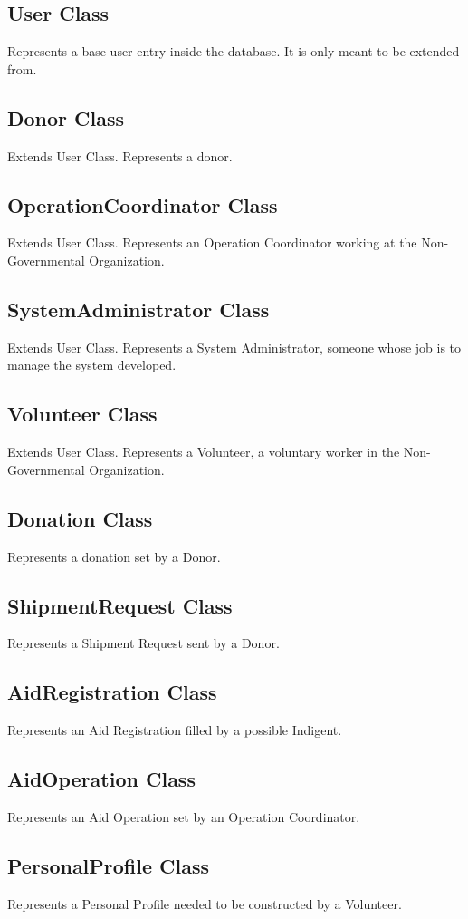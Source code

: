\documentclass[a4paper,12pt]{report}
\begin{document}
		\subsection{User Class}
			Represents a base user entry inside the database. It is only meant to be extended from.
		\subsection{Donor Class}
			Extends User Class. Represents a donor.
		\subsection{OperationCoordinator Class}
			Extends User Class. Represents an Operation Coordinator working at the Non-Governmental Organization.
		\subsection{SystemAdministrator Class}
			Extends User Class. Represents a System Administrator, someone whose job is to manage the system developed.
		\subsection{Volunteer Class}
			Extends User Class. Represents a Volunteer, a voluntary worker in the Non-Governmental Organization.
		\subsection{Donation Class}
			Represents a donation set by a Donor.
		\subsection{ShipmentRequest Class}
			Represents a Shipment Request sent by a Donor.
		\subsection{AidRegistration Class}
			Represents an Aid Registration filled by a possible Indigent.
		\subsection{AidOperation Class}
			Represents an Aid Operation set by an Operation Coordinator.
		\subsection{PersonalProfile Class}
			Represents a Personal Profile needed to be constructed by a Volunteer.
		
\end{document}
